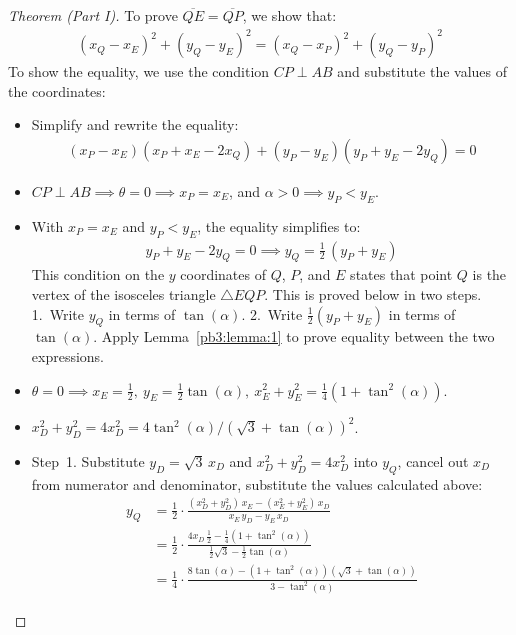 \begin{proof}[Theorem (Part I)]
To prove $\overline{QE}=\overline{QP}$, we show that:
\begin{align*}
(x_{Q}-x_{E})^{2} + (y_{Q}-y_{E})^{2}
  = (x_{Q}-x_{P})^{2} + (y_{Q}-y_{P})^{2}
\end{align*}
To show the equality, we use the condition $CP \perp AB$ and substitute the values of the coordinates:
\begin{itemize}
\item Simplify and rewrite the equality:
\begin{align*}
(x_{P}-x_{E}) (x_{P}+x_{E}-2x_{Q})
+ (y_{P}-y_{E}) (y_{P}+y_{E}-2y_{Q})
= 0
\end{align*}
\item $CP \perp AB \implies \theta=0 \implies x_{P}=x_{E}$, and $\alpha>0 \implies y_{P}<y_{E}$.
\item With $x_{P}=x_{E}$ and $y_{P}<y_{E}$, the equality simplifies to:
\begin{align*}
y_{P} + y_{E} - 2y_{Q} = 0
\implies 
y_{Q} = \frac{1}{2} \, (y_{P} + y_{E})
\end{align*}
This condition on the $y$ coordinates of $Q$, $P$, and $E$ states that point $Q$ is the vertex of the isosceles triangle $\triangle EQP$. This is proved below in two steps. 1.~Write $y_{Q}$ in terms of $\tan(\alpha)$. 2.~Write $\frac{1}{2}(y_{P}+y_{E})$ in terms of $\tan(\alpha)$. Apply Lemma~\ref{pb3:lemma:1} to prove equality between the two expressions. 
\item $\theta=0 \implies x_{E}=\frac{1}{2}, \ y_{E}=\frac{1}{2}\tan(\alpha), \ x_{E}^{2}+y_{E}^{2}=\frac{1}{4}(1+\tan^{2}(\alpha))$.
\item $x_{D}^{2}+y_{D}^{2}=4x_{D}^{2}=4\tan^{2}(\alpha)/(\sqrt{3}+\tan(\alpha))^{2}$.
\item Step~1. Substitute $y_{D}=\sqrt{3}\,x_{D}$ and $x_{D}^{2}+y_{D}^{2}=4x_{D}^{2}$ into $y_{Q}$, cancel out $x_{D}$ from numerator and denominator, substitute the values calculated above:
\begin{align*}
y_{Q} & = \frac{1}{2} \cdot \frac{(x_{D}^{2}+y_{D}^{2}) \, x_{E} - (x_{E}^{2}+y_{E}^{2}) \, x_{D}}{x_{E} \, y_{D} - y_{E} \, x_{D}}
\\[1ex]
& = \frac{1}{2} \cdot \frac{4x_{D} \, \frac{1}{2} - \frac{1}{4} (1+\tan^{2}(\alpha))}{\frac{1}{2}\sqrt{3}-\frac{1}{2}\tan(\alpha)}
\\[1ex]
& = \frac{1}{4} \cdot \frac{8\tan(\alpha)-(1+\tan^{2}(\alpha))(\sqrt{3}+\tan(\alpha))}{3 - \tan^{2}(\alpha)}
\end{align*}

\end{itemize}
\end{proof}
